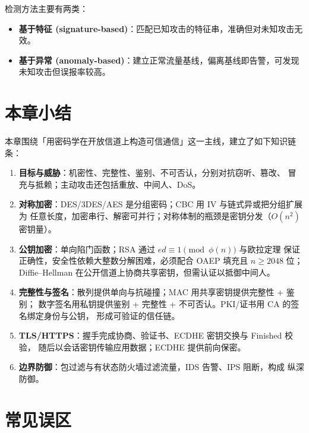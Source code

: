 检测方法主要有两类：
\begin{itemize}
    \item \textbf{基于特征 (signature-based)}：匹配已知攻击的特征串，准确但对未知攻击无效。
    \item \textbf{基于异常 (anomaly-based)}：建立正常流量基线，偏离基线即告警，可发现
    未知攻击但误报率较高。
\end{itemize}

\section{本章小结}

本章围绕「用密码学在开放信道上构造可信通信」这一主线，建立了如下知识链条：

\begin{enumerate}
    \item \textbf{目标与威胁}：机密性、完整性、鉴别、不可否认，分别对抗窃听、篡改、
    冒充与抵赖；主动攻击还包括重放、中间人、DoS。
    \item \textbf{对称加密}：DES/3DES/AES 是分组密码；CBC 用 IV 与链式异或把分组扩展为
    任意长度，加密串行、解密可并行；对称体制的瓶颈是密钥分发（$O(n^2)$ 密钥量）。
    \item \textbf{公钥加密}：单向陷门函数；RSA 通过 $ed\equiv1\pmod{\phi(n)}$ 与欧拉定理
    保证正确性，安全性依赖大整数分解困难，必须配合 OAEP 填充且 $n\ge2048$ 位；
    Diffie--Hellman 在公开信道上协商共享密钥，但需认证以抵御中间人。
    \item \textbf{完整性与签名}：散列提供单向与抗碰撞；MAC 用共享密钥提供完整性 + 鉴别；
    数字签名用私钥提供鉴别 + 完整性 + 不可否认。PKI/证书用 CA 的签名绑定身份与公钥，
    形成可验证的信任链。
    \item \textbf{TLS/HTTPS}：握手完成协商、验证书、ECDHE 密钥交换与 Finished 校验，
    随后以会话密钥传输应用数据；ECDHE 提供前向保密。
    \item \textbf{边界防御}：包过滤与有状态防火墙过滤流量，IDS 告警、IPS 阻断，构成
    纵深防御。
\end{enumerate}

\section{常见误区}

